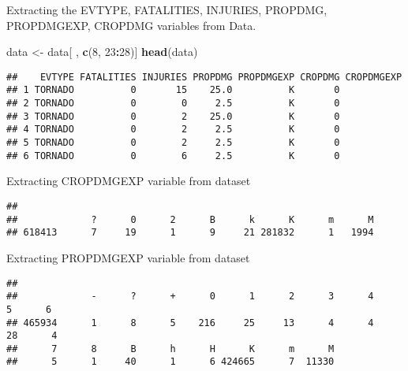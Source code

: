 \documentclass[
]{article}
\newenvironment{Shaded}{\begin{snugshade}}{\end{snugshade}}
\newcommand{\DecValTok}[1]{\textcolor[rgb]{0.00,0.00,0.81}{#1}}
\newcommand{\KeywordTok}[1]{\textcolor[rgb]{0.13,0.29,0.53}{\textbf{#1}}}
\newcommand{\NormalTok}[1]{#1}
\newcommand{\OperatorTok}[1]{\textcolor[rgb]{0.81,0.36,0.00}{\textbf{#1}}}
\newcommand{\StringTok}[1]{\textcolor[rgb]{0.31,0.60,0.02}{#1}}
\begin{document}
Extracting the EVTYPE, FATALITIES, INJURIES, PROPDMG, PROPDMGEXP,
CROPDMG variables from Data.

\begin{Shaded}
\begin{Highlighting}[]
\NormalTok{data <-}\StringTok{ }\NormalTok{data[ , }\KeywordTok{c}\NormalTok{(}\DecValTok{8}\NormalTok{, }\DecValTok{23}\OperatorTok{:}\DecValTok{28}\NormalTok{)]}
\KeywordTok{head}\NormalTok{(data)}
\end{Highlighting}
\end{Shaded}

\begin{verbatim}
##    EVTYPE FATALITIES INJURIES PROPDMG PROPDMGEXP CROPDMG CROPDMGEXP
## 1 TORNADO          0       15    25.0          K       0           
## 2 TORNADO          0        0     2.5          K       0           
## 3 TORNADO          0        2    25.0          K       0           
## 4 TORNADO          0        2     2.5          K       0           
## 5 TORNADO          0        2     2.5          K       0           
## 6 TORNADO          0        6     2.5          K       0
\end{verbatim}

Extracting CROPDMGEXP variable from dataset

\begin{Shaded}
\end{Shaded}

\begin{verbatim}
## 
##             ?      0      2      B      k      K      m      M 
## 618413      7     19      1      9     21 281832      1   1994
\end{verbatim}

Extracting PROPDMGEXP variable from dataset

\begin{Shaded}
\end{Shaded}

\begin{verbatim}
## 
##             -      ?      +      0      1      2      3      4      5      6 
## 465934      1      8      5    216     25     13      4      4     28      4 
##      7      8      B      h      H      K      m      M 
##      5      1     40      1      6 424665      7  11330
\end{verbatim}
\end{document}
